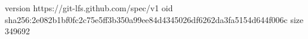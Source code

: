 version https://git-lfs.github.com/spec/v1
oid sha256:2e082b1bf0fc2c75e5ff3b350a99ee84d4345026df6262da3fa5154d644f006c
size 349692
